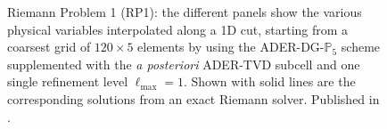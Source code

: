 \begin{figure}
		\caption[
		RP1 Riemann problem (4 panels), 
		]{  Riemann Problem 1 (RP1): the
			different panels show the various physical variables interpolated
			along a 1D cut, starting from a coarsest grid of $120\times5$
			elements by using the ADER-DG-$\mathbb{P}_5$ scheme supplemented with
			the \textit{a posteriori}  ADER-TVD subcell and one single refinement level
			$\ell_{\text{max}} = 1$. Shown with solid lines are the
			corresponding solutions from an exact Riemann solver.
			Published in \cite{Fambri2018}.
		}\label{fig:Balsara1P5}
	\end{figure}

